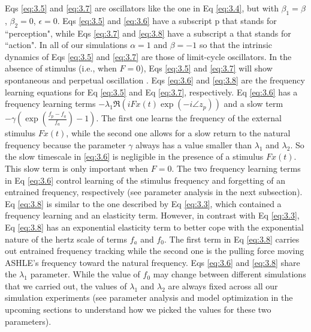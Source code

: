 \documentclass[10pt,letterpaper]{article}
\begin{document}
Eqs \eqref{eq:3.5} and \eqref{eq:3.7} are oscillators like the one in Eq \eqref{eq:3.4}, but with $\beta_1 = \beta$, $\beta_2=0$, $\epsilon=0$. Eqs \eqref{eq:3.5} and \eqref{eq:3.6} have a subscript p that stands for ``perception", while Eqs \eqref{eq:3.7} and \eqref{eq:3.8} have a subscript a that stands for ``action". In all of our simulations $\alpha=1$ and $\beta=-1$ so that the intrinsic dynamics of Eqs \eqref{eq:3.5} and \eqref{eq:3.7} are those of limit-cycle oscillators. In the absence of stimulus (i.e., when $F = 0$), Eqs \eqref{eq:3.5} and \eqref{eq:3.7} will show spontaneous and perpetual oscillation \cite{kim2015signal}. Eqs \eqref{eq:3.6} and \eqref{eq:3.8} are the frequency learning equations for Eq \eqref{eq:3.5} and Eq \eqref{eq:3.7}, respectively. Eq \eqref{eq:3.6} has a frequency learning terms $-\lambda_1\Re\left( iFx(t)\exp(-i\angle z_p) \right)$ and a slow term $-\gamma\left( \exp\left(\frac{f_p-f_a}{f_a}\right)-1 \right)$. The first one learns the frequency of the external stimulus $Fx(t)$, while the second one allows for a slow return to the natural frequency because the parameter $\gamma$ always has a value smaller than $\lambda_1$ and $\lambda_2$. So the slow timescale in \eqref{eq:3.6} is negligible in the presence of a stimulus $Fx(t)$. This slow term is only important when $F = 0$. The two frequency learning terms in Eq \eqref{eq:3.6} control learning of the stimulus frequency and forgetting of an entrained frequency, respectively (see parameter analysis in the next subsection). Eq \eqref{eq:3.8} is similar to the one described by Eq \eqref{eq:3.3}, which contained a frequency learning and an elasticity term. However, in contrast with Eq \eqref{eq:3.3}, Eq \eqref{eq:3.8} has an exponential elasticity term to better cope with the exponential nature of the hertz scale of terms $f_a$ and $f_0$. The first term in Eq \eqref{eq:3.8} carries out entrained frequency tracking while the second one is the pulling force moving ASHLE's frequency toward the natural frequency. Eqs \eqref{eq:3.6} and \eqref{eq:3.8} share the $\lambda_1$ parameter. While the value of $f_0$ may change between different simulations that we carried out, the values of $\lambda_1$ and $\lambda_2$ are always fixed across all our simulation experiments (see parameter analysis and model optimization in the upcoming sections to understand how we picked the values for these two parameters).
\end{document}
